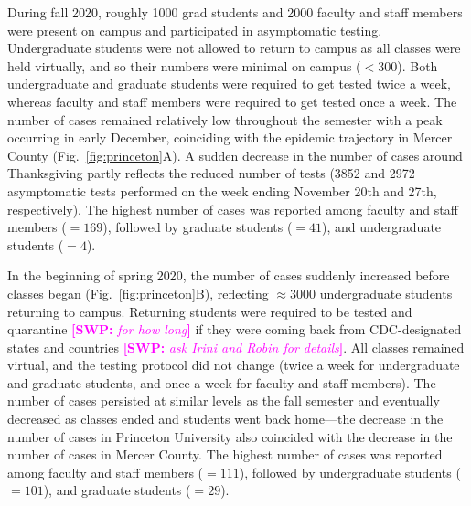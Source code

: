\documentclass[12pt]{article}
\newcommand{\fref}[1]{Fig.~\ref{fig:#1}}
\newcommand{\comment}[3]{\textcolor{#1}{\textbf{[#2: }\textsl{#3}\textbf{]}}}
\newcommand{\swp}[1]{\comment{magenta}{SWP}{#1}}
\begin{document}
During fall 2020, roughly 1000 grad students and 2000 faculty and staff members were present on campus and participated in asymptomatic testing. 
Undergraduate students were not allowed to return to campus as all classes were held virtually, and so their numbers were minimal on campus ($<300$).  
Both undergraduate and graduate students were required to get tested twice a week, whereas faculty and staff members were required to get tested once a week.
The number of cases remained relatively low throughout the semester with a peak occurring in early December, coinciding with the epidemic trajectory in Mercer County (\fref{princeton}A).  
A sudden decrease in the number of cases around Thanksgiving partly reflects the reduced number of tests (3852 and 2972 asymptomatic tests performed on the week ending November 20th and 27th, respectively).
The highest number of cases was reported among faculty and staff members ($=169$), followed by graduate students ($=41$), and undergraduate students ($=4$).

In the beginning of spring 2020, the number of cases suddenly increased before classes began (\fref{princeton}B), reflecting $\approx 3000$ undergraduate students returning to campus.
Returning students were required to be tested and quarantine \swp{for how long} if they were coming back from CDC-designated states and countries \swp{ask Irini and Robin for details}.
All classes remained virtual, and the testing protocol did not change (twice a week for undergraduate and graduate students, and once a week for faculty and staff members).
The number of cases persisted at similar levels as the fall semester and eventually decreased as classes ended and students went back home---the decrease in the number of cases in Princeton University also coincided with the decrease in the number of cases in Mercer County.
The highest number of cases was reported among faculty and staff members ($=111$), followed by undergraduate students ($=101$), and graduate students ($=29$).
\end{document}
